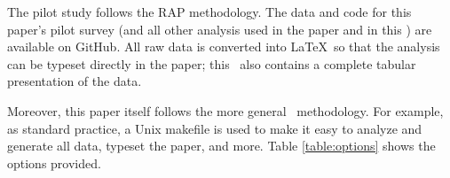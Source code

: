 \documentclass[10pt,a4paper]{article}
\begin{document}



The pilot study follows the RAP methodology. The data and code for this paper's pilot survey (and all other analysis used in the paper and in this \supplement) are available on GitHub. All raw data is converted into \LaTeX\ so that the analysis can be typeset directly in the paper; this \supplement\ also contains a complete tabular presentation of the data.

Moreover, this paper itself follows the more general \RAPstar\ methodology. For example, as standard practice, a Unix makefile is used to make it easy to analyze and generate all data, typeset the paper, and more. Table \ref{table:options} shows the options provided.

\begin{table}[t]
\begin{center}

\end{center}
\caption{Conforming to the \RAPstar\ methodology, the abbreviated summary above was generated automatically, by using \texttt{make data}. A full list of \texttt{make} options is generated by \texttt{make} or \texttt{make help} when run on the Unix command line. %
}
\label{table:options}
\end{table}
\end{document}
